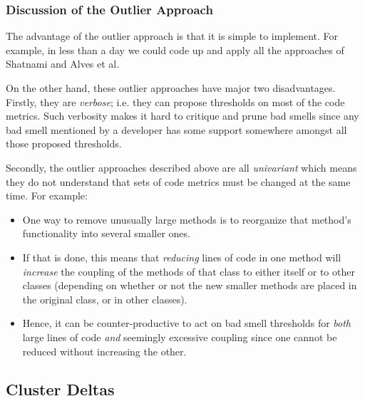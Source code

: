 \documentclass{sig-alternate}
\begin{document}
\subsubsection{Discussion of the Outlier Approach}
The advantage of the outlier
approach is that it is simple to implement. 
For example, in less than a day we could
code up and apply all the approaches of Shatnami and 
Alves et al.

On the other hand, these outlier approaches have major two disadvantages. 
Firstly, they are {\em verbose}; i.e.  they can
propose thresholds on most of the code metrics.
Such verbosity makes it hard   to critique and prune bad smells
since any bad smell mentioned by a developer has some support
somewhere amongst all those proposed thresholds.

Secondly, the outlier approaches described above are all 
{\em univariant} which means
they do  not understand
that sets of code metrics must
be changed at the same time.
For example:
\begin{itemize} 
\item One way to remove unusually large methods is to reorganize that method's
functionality into several smaller ones. 
\item If that is done,
this means that {\em reducing} lines of code in one method
will {\em increase} the coupling of the methods of that class to
either itself or to other classes (depending on whether or not
the new smaller methods are placed in the original class, or in other classes).
\item
Hence, it can be counter-productive to act on bad smell thresholds for {\em both}
large lines of code {\em and} seemingly excessive coupling since
one cannot be reduced without increasing the other.
\end{itemize}



\subsection{Cluster Deltas}
\end{document}

